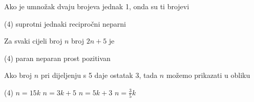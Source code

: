 \begin{zadatak}
	Ako je umnožak dvaju brojeva jednak 1, onda su ti brojevi
    \begin{tasks}(4)
		\task suprotni
		\task jednaki
		\task recipročni
		\task neparni
	\end{tasks}
\end{zadatak}

\begin{zadatak}
	Za svaki cijeli broj $n$ broj $2n + 5$ je
    \begin{tasks}(4)
		\task paran
		\task neparan
		\task prost
		\task pozitivan
	\end{tasks}
\end{zadatak}

\begin{zadatak}
	Ako broj $n$ pri dijeljenju s 5 daje ostatak 3, tada $n$ možemo prikazati u obliku
    \begin{tasks}(4)
		\task $n=15k$
		\task $n=3k+5$
		\task $n=5k+3$
		\task $n=\displaystyle \frac{3}{5}k$
	\end{tasks}
\end{zadatak}

\newpage